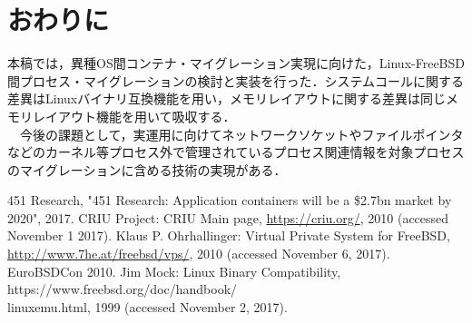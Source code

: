 \documentclass{ipsjpapers}
\begin{document}
\section{おわりに}
本稿では，異種OS間コンテナ・マイグレーション実現に向けた，Linux-FreeBSD間プロセス・マイグレーションの検討と実装を行った．システムコールに関する差異はLinuxバイナリ互換機能を用い，メモリレイアウトに関する差異は同じメモリレイアウト機能を用いて吸収する．\\
　今後の課題として，実運用に向けてネットワークソケットやファイルポインタなどのカーネル等プロセス外で管理されているプロセス関連情報を対象プロセスのマイグレーションに含める技術の実現がある．
\begin{thebibliography}{99}

  	451 Research, "451 Research: Application containers will be a \$2.7bn market by 2020", 2017.
  	CRIU Project: CRIU Main page, \url{https://criu.org/}, 2010 (accessed November 1 2017).
  Klaus P. Ohrhallinger: Virtual Private System for FreeBSD, \url{http://www.7he.at/freebsd/vps/}, 2010 (accessed November 6, 2017). EuroBSDCon 2010.
  Jim Mock: Linux Binary Compatibility, https://www.freebsd.org\slash{}doc\slash{}handbook\slash{}\\linuxemu.html, 1999 (accessed November 2, 2017).
\end{thebibliography}
\end{document}
